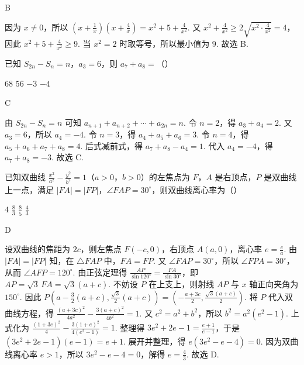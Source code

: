 \documentclass[UTF8,a4paper,oneside,11pt]{ctexbook}
\begin{document}
\begin{answer}
B
\end{answer}

\begin{solution}
因为 \(x\ne 0\)，所以 \(\left( x+\frac{1}{x} \right)\left( x+\frac{4}{x} \right)=x^2+5+\frac{4}{x^2}\). 又 \(x^2+\frac{4}{x^2}\ge 2\sqrt{x^2\cdot \frac{4}{x^2}}=4\)，因此 \(x^2+5+\frac{4}{x^2}\ge 9\).
当 \(x^2=2\) 时取等号，所以最小值为 \(9\).
故选 B.
\end{solution}

\begin{problem}
已知 \(S_{2n}-S_n=n\)，\(a_3=6\)，则 \(a_7+a_8=\)（\quad）

\choices
    {\(68\)}
    {\(56\)}
    {\(-3\)}
    {\(-4\)}
\end{problem}

\begin{answer}
C
\end{answer}

\begin{solution}
由 \(S_{2n}-S_n=n\) 可知 \(a_{n+1}+a_{n+2}+\cdots +a_{2n}=n\).
令 \(n=2\)，得 \(a_3+a_4=2\). 又 \(a_3=6\)，所以 \(a_4=-4\).
令 \(n=3\)，得 \(a_4+a_5+a_6=3\).
令 \(n=4\)，得 \(a_5+a_6+a_7+a_8=4\).
后式减前式，得 \(a_7+a_8-a_4=1\). 代入 \(a_4=-4\)，得 \(a_7+a_8=-3\).
故选 C.
\end{solution}

\begin{problem}
已知双曲线 \(\frac{x^2}{a^2}-\frac{y^2}{b^2}=1\)（\(a>0\)，\(b>0\)）的左焦点为 \(F\)，\(A\) 是右顶点，\(P\) 是双曲线上一点，满足 \(|FA|=|FP|\)，\(\angle FAP=30^\circ\)，则双曲线离心率为（\quad）

\choices
    {\(4\)}
    {\(\frac{8}{3}\)}
    {\(\frac{8}{5}\)}
    {\(\frac{4}{3}\)}
\end{problem}

\begin{answer}
D
\end{answer}

\begin{solution}
设双曲线的焦距为 \(2c\)，则左焦点 \(F\left( -c,0 \right)\)，右顶点 \(A\left( a,0 \right)\)，离心率 \(e=\frac{c}{a}\).
由 \(|FA|=|FP|\) 知，在 \(\triangle FAP\) 中，\(FA=FP\). 又 \(\angle FAP=30^\circ\)，所以 \(\angle FPA=30^\circ\)，从而 \(\angle AFP=120^\circ\). 由正弦定理得 \(\frac{AP}{\sin 120^\circ}=\frac{FA}{\sin 30^\circ}\)，即 \(AP=\sqrt{3}\,FA=\sqrt{3}\left( a+c \right)\).
不妨设 \(P\) 在上支上，则射线 \(AP\) 与 \(x\) 轴正向夹角为 \(150^\circ\). 因此 \(P\left( a-\frac{3}{2}\left( a+c \right),\frac{\sqrt{3}}{2}\left( a+c \right) \right)=\left( -\frac{a+3c}{2},\frac{\sqrt{3}\left( a+c \right)}{2} \right)\).
将 \(P\) 代入双曲线方程，得 \(\frac{\left( a+3c \right)^2}{4a^2}-\frac{3\left( a+c \right)^2}{4b^2}=1\). 又 \(c^2=a^2+b^2\)，所以 \(b^2=a^2\left( e^2-1 \right)\). 上式化为 \(\frac{\left( 1+3e \right)^2}{4}-\frac{3\left( 1+e \right)^2}{4\left( e^2-1 \right)}=1\). 整理得 \(3e^2+2e-1=\frac{e+1}{e-1}\)，于是 \(\left( 3e^2+2e-1 \right)\left( e-1 \right)=e+1\). 展开并整理，得 \(e\left( 3e^2-e-4 \right)=0\). 因为双曲线离心率 \(e>1\)，所以 \(3e^2-e-4=0\)，解得 \(e=\frac{4}{3}\).
故选 D.
\end{solution}
\end{document}
